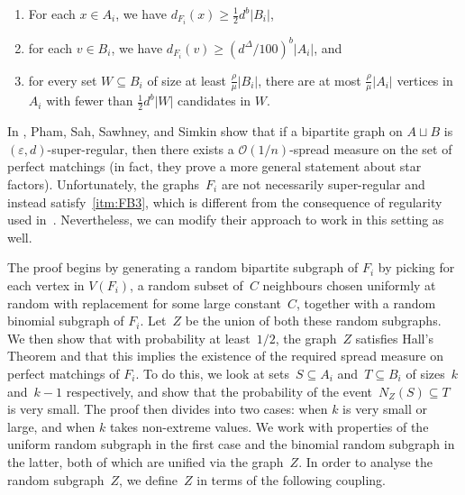 \documentclass[final]{article}
\theoremstyle{definition}
\newcommand{\itmarab}[1]{\mbox{\rm 
({\it #1}\,\arabic{*}\hspace{0.05em})}}
\newcommand{\eps}{\varepsilon}
\begin{document}
\begin{enumerate}[label=\itmarab{FB}]
    \item \label{itm:FB1} For each $x \in A_i$, we have $d_{F_i}(x) \geq  \frac{1}{2} d^b |B_i|$,
    \item \label{itm:FB2} for each $v \in B_i$, we have $d_{F_i}(v) \geq  (d^{\Delta}/100)^b |A_i|$, and
    \item \label{itm:FB3}for every set $W \subseteq B_i$ of size at least $\frac{\rho}{\mu}|B_i|$, there are at most $\frac{\rho}{\mu}|A_i|$ vertices in $A_i$ with fewer than $\frac{1}{2} d^b |W|$ candidates in $W$.
\end{enumerate}

In \cite{toolkit_robust_thresholds}, Pham, Sah, Sawhney, and Simkin show that if a bipartite graph on $A\sqcup B$ is $(\eps, d)$-super-regular, then there exists a $\mathcal{O}(1/n)$-spread measure on the set of perfect matchings (in fact, they prove a more general statement about star factors). Unfortunately, the graphs~$F_i$ are not necessarily super-regular and instead satisfy~\ref{itm:FB3}, which is different from the consequence of regularity used in~\cite{toolkit_robust_thresholds}. Nevertheless, we can modify their approach to work in this setting as well.

The proof begins by generating a random bipartite subgraph of $F_i$ by picking for each vertex in $V(F_i)$, a random subset of~$C$ neighbours chosen uniformly at random with replacement for some large constant~$C$, together with a random binomial subgraph of $F_i$. Let~$Z$ be the union of both these random subgraphs. We then show that with probability at least~$1/2$, the graph~$Z$ satisfies Hall's Theorem and that this implies the existence of the required spread measure on perfect matchings of $F_i$. To do this, we look at sets~$S \subseteq A_i$ and~$T\subseteq B_i$ of sizes~$k$ and~$k-1$ respectively, and show that the probability of the event~$N_Z(S) \subseteq T$ is very small. The proof then divides into two cases: when $k$ is very small or large, and when $k$ takes non-extreme values. We work with properties of the uniform random subgraph in the first case and the binomial random subgraph in the latter, both of which are unified via the graph~$Z$. In order to analyse the random subgraph~$Z$, we define~$Z$ in terms of the following coupling.
\end{document}
